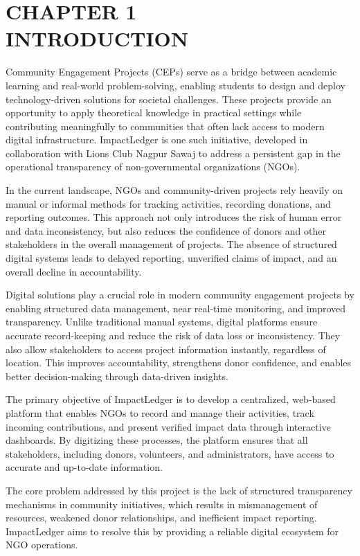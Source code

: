 \documentclass[12pt,a4paper]{article}
\begin{document}
\newpage
\section{CHAPTER 1\\INTRODUCTION}
Community Engagement Projects (CEPs) serve as a bridge between academic learning and real-world problem-solving, enabling students to design and deploy technology-driven solutions for societal challenges. These projects provide an opportunity to apply theoretical knowledge in practical settings while contributing meaningfully to communities that often lack access to modern digital infrastructure. ImpactLedger is one such initiative, developed in collaboration with Lions Club Nagpur Sawaj to address a persistent gap in the operational transparency of non-governmental organizations (NGOs).

In the current landscape, NGOs and community-driven projects rely heavily on manual or informal methods for tracking activities, recording donations, and reporting outcomes. This approach not only introduces the risk of human error and data inconsistency, but also reduces the confidence of donors and other stakeholders in the overall management of projects. The absence of structured digital systems leads to delayed reporting, unverified claims of impact, and an overall decline in accountability.

Digital solutions play a crucial role in modern community engagement projects by enabling structured data management, near real-time monitoring, and improved transparency. Unlike traditional manual systems, digital platforms ensure accurate record-keeping and reduce the risk of data loss or inconsistency. They also allow stakeholders to access project information instantly, regardless of location. This improves accountability, strengthens donor confidence, and enables better decision-making through data-driven insights.

The primary objective of ImpactLedger is to develop a centralized, web-based platform that enables NGOs to record and manage their activities, track incoming contributions, and present verified impact data through interactive dashboards. By digitizing these processes, the platform ensures that all stakeholders, including donors, volunteers, and administrators, have access to accurate and up-to-date information.

The core problem addressed by this project is the lack of structured transparency mechanisms in community initiatives, which results in mismanagement of resources, weakened donor relationships, and inefficient impact reporting. ImpactLedger aims to resolve this by providing a reliable digital ecosystem for NGO operations.
\end{document}
